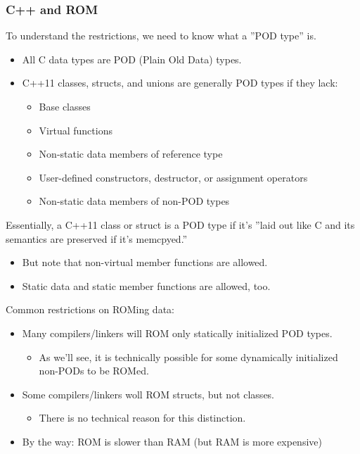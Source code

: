 \subsubsection{C++ and ROM}
To understand the restrictions, we need to know what a ''POD type'' is.
\begin{itemize}
  \item All C data types are POD (Plain Old Data) types.
  \item C++11 classes, structs, and unions are generally POD types if they lack:
  \begin{itemize}
    \item Base classes
    \item Virtual functions
    \item Non-static data members of reference type
    \item User-defined constructors, destructor, or assignment operators
    \item Non-static data members of non-POD types
  \end{itemize}
\end{itemize}
Essentially, a C++11 class or struct is a POD type if it's ''laid out like C and its semantics are preserved if it's memcpyed.''
\begin{itemize}
  \item But note that non-virtual member functions are allowed.
  \item Static data and static member functions are allowed, too.
\end{itemize}

Common restrictions on ROMing data:
\begin{itemize}
  \item Many compilers/linkers will ROM only statically initialized POD types.
  \begin{itemize}
    \item As we'll see, it is technically possible for some dynamically initialized non-PODs to be ROMed.
  \end{itemize}
  \item Some compilers/linkers woll ROM structs, but not classes.
  \begin{itemize}
    \item There is no technical reason for this distinction.
  \end{itemize}
  \item By the way: ROM is slower than RAM (but RAM is more expensive)
\end{itemize}

